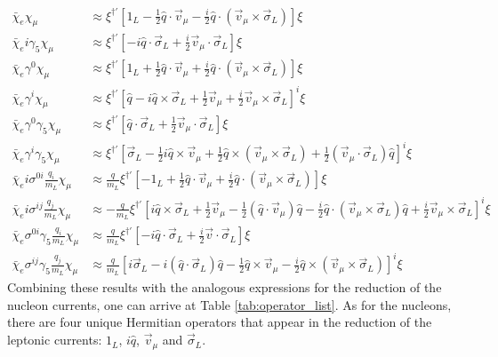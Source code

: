 \documentclass{book}[letterpaper,12pt]
\begin{document}
\begin{equation}
\begin{split}
\bar{\chi}_e\chi_{\mu}&\approx \xi^{\dag'}\left[1_L-\frac{1}{2}\hat{q}\cdot\vec{v}_{\mu}-\frac{i}{2}\hat{q}\cdot\left(\vec{v}_{\mu}\times\vec{\sigma}_L\right)\right]\xi\\
\bar{\chi}_ei\gamma_5\chi_{\mu}&\approx \xi^{\dag'}\left[-i\hat{q}\cdot\vec{\sigma}_L+\frac{i}{2}\vec{v}_{\mu}\cdot\vec{\sigma}_L\right]\xi\\
\bar{\chi}_e\gamma^0\chi_{\mu}&\approx \xi^{\dag'}\left[1_L+\frac{1}{2}\hat{q}\cdot\vec{v}_{\mu}+\frac{i}{2}\hat{q}\cdot\left(\vec{v}_{\mu}\times\vec{\sigma}_L\right)\right]\xi\\
\bar{\chi}_e\gamma^i\chi_{\mu}&\approx \xi^{\dag'}\left[\hat{q}-i\hat{q}\times\vec{\sigma}_L+\frac{1}{2}\vec{v}_{\mu}+\frac{i}{2}\vec{v}_{\mu}\times\vec{\sigma}_L\right]^i\xi\\
\bar{\chi}_e\gamma^0\gamma_5\chi_{\mu}&\approx \xi^{\dag'}\left[\hat{q}\cdot\vec{\sigma}_L+\frac{1}{2}\vec{v}_{\mu}\cdot\vec{\sigma}_L\right]\xi\\
\bar{\chi}_e\gamma^i\gamma_5\chi_{\mu}&\approx \xi^{\dag'}\left[\vec{\sigma}_L-\frac{1}{2}i\hat{q}\times\vec{v}_{\mu}+\frac{1}{2}\hat{q}\times\left(\vec{v}_{\mu}\times\vec{\sigma}_L\right)+\frac{1}{2}\left(\vec{v}_{\mu}\cdot\vec{\sigma}_L\right)\hat{q}\right]^i\xi\\
\bar{\chi}_ei\sigma^{0i}\frac{q_i}{m_L}\chi_{\mu}&\approx \frac{q}{m_L}\xi^{\dag'}\left[-1_L+\frac{1}{2}\hat{q}\cdot\vec{v}_{\mu}+\frac{i}{2}\hat{q}\cdot\left(\vec{v}_{\mu}\times\vec{\sigma}_L\right)\right]\xi\\
\bar{\chi}_ei\sigma^{ij}\frac{q_j}{m_L}\chi_{\mu}&\approx -\frac{q}{m_L}\xi^{\dag'}\left[i\hat{q}\times\vec{\sigma}_L+\frac{1}{2}\vec{v}_{\mu}-\frac{1}{2}\left(\hat{q}\cdot\vec{v}_{\mu}\right)\hat{q}-\frac{i}{2}\hat{q}\cdot\left(\vec{v}_{\mu}\times\vec{\sigma}_L\right)\hat{q}+\frac{i}{2}\vec{v}_{\mu}\times\vec{\sigma}_L\right]^i\xi\\
\bar{\chi}_e\sigma^{0i}\gamma_5\frac{q_i}{m_L}\chi_{\mu}&\approx \frac{q}{m_L}\xi^{\dag'}\left[-i\hat{q}\cdot\vec{\sigma}_L+\frac{i}{2}\vec{v}\cdot\vec{\sigma}_L\right]\xi\\
\bar{\chi}_e\sigma^{ij}\gamma_5\frac{q_j}{m_L}\chi_{\mu}&\approx \frac{q}{m_L}\left[i\vec{\sigma}_L-i\left(\hat{q}\cdot\vec{\sigma}_L\right)\hat{q}-\frac{1}{2}\hat{q}\times\vec{v}_{\mu}-\frac{i}{2}\hat{q}\times\left(\vec{v}_{\mu}\times\vec{\sigma}_L\right)\right]^i\xi
\end{split}
\end{equation}
Combining these results with the analogous expressions for the reduction of the nucleon currents, one can arrive at Table \ref{tab:operator_list}. As for the nucleons, there are four unique Hermitian operators that appear in the reduction of the leptonic currents: $1_L$, $i\hat{q}$, $\vec{v}_{\mu}$ and $\vec{\sigma}_L$. 
\end{document}
